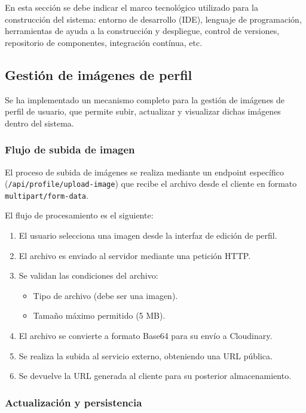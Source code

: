 En esta sección se debe indicar el marco tecnológico utilizado para la construcción del sistema: entorno de desarrollo (IDE), lenguaje de programación, herramientas de ayuda a la construcción y despliegue, control de versiones, repositorio de componentes, integración contínua, etc.

\subsection{Gestión de imágenes de perfil}

Se ha implementado un mecanismo completo para la gestión de imágenes de perfil de usuario, que permite subir, actualizar y visualizar dichas imágenes dentro del sistema.

\subsubsection{Flujo de subida de imagen}

El proceso de subida de imágenes se realiza mediante un endpoint específico (\texttt{/api/profile/\allowbreak upload-image}) que recibe el archivo desde el cliente en formato \texttt{multipart/\allowbreak form-data}.

El flujo de procesamiento es el siguiente:

\begin{enumerate}
    \item El usuario selecciona una imagen desde la interfaz de edición de perfil.
    \item El archivo es enviado al servidor mediante una petición HTTP.
    \item Se validan las condiciones del archivo:
    \begin{itemize}
        \item Tipo de archivo (debe ser una imagen).
        \item Tamaño máximo permitido (5 MB).
    \end{itemize}
    \item El archivo se convierte a formato Base64 para su envío a Cloudinary.
    \item Se realiza la subida al servicio externo, obteniendo una URL pública.
    \item Se devuelve la URL generada al cliente para su posterior almacenamiento.
\end{enumerate}

\subsubsection{Actualización y persistencia}

